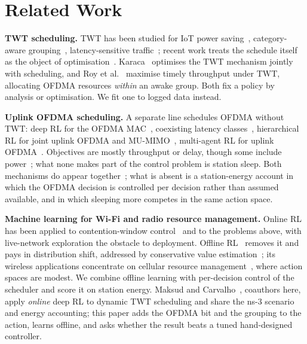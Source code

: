 \section{Related Work}

\textbf{TWT scheduling.} TWT has been studied for IoT power
saving~\cite{chen2019twt}, category-aware grouping~\cite{qiu2021category},
latency-sensitive traffic~\cite{yang2021twt}; recent work treats the schedule itself as
the object of optimisation~\cite{busacca2026twt}. Karaca~\cite{karaca2020joint}
optimises the TWT mechanism jointly with scheduling, and Roy et
al.~\cite{roy2023maximization} maximise timely throughput under TWT, allocating
OFDMA resources \emph{within} an awake group. Both fix a policy by analysis or optimisation. We fit one to logged data
instead.

\textbf{Uplink OFDMA scheduling.} A separate line schedules OFDMA without TWT:
deep RL for the OFDMA MAC~\cite{kotagiri2021distributed}, coexisting latency
classes~\cite{tan2024drl}, hierarchical RL for joint uplink OFDMA and
MU-MIMO~\cite{noh2024joint}, multi-agent RL for uplink
OFDMA~\cite{han2024multiagent,liu2025priority}. Objectives are mostly
throughput or delay, though
some include power~\cite{liu2025priority}; what none makes part of the control
problem is station sleep. Both mechanisms do appear
together~\cite{karaca2020joint,roy2023maximization}; what is absent is a
station-energy account in which the OFDMA decision is controlled per decision
rather than assumed available, and in which sleeping more competes in the same
action space.

\textbf{Machine learning for Wi-Fi and radio resource management.} Online RL
has been applied to contention-window control~\cite{wydmanski2021contention} and
to the problems above, with live-network exploration the obstacle to deployment.
Offline RL~\cite{levine2020offline} removes it and pays in distribution shift,
addressed by conservative value estimation~\cite{kumar2020cql,kostrikov2022iql};
its wireless applications concentrate on cellular resource
management~\cite{yang2024offline,eldeeb2026marl}, where
action spaces are modest. We combine offline learning with per-decision control
of the scheduler and score it on station energy. Maksud and Carvalho~\cite{maksud2026drltwt}, coauthors
here, apply \emph{online} deep RL to dynamic TWT scheduling and share the ns-3
scenario and energy accounting; this paper adds the OFDMA bit and the grouping
to the action, learns offline, and asks whether the result beats a tuned
hand-designed controller.
